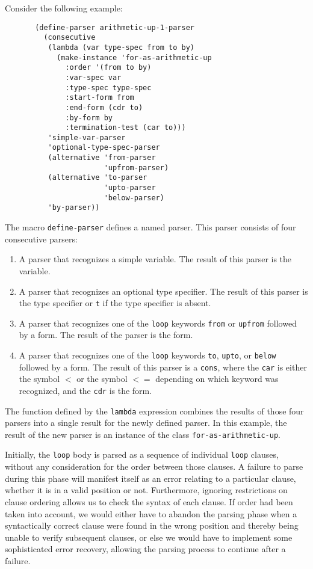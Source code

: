 Consider the following example:

{\small\begin{verbatim}
       (define-parser arithmetic-up-1-parser
         (consecutive
          (lambda (var type-spec from to by)
            (make-instance 'for-as-arithmetic-up
              :order '(from to by)
              :var-spec var
              :type-spec type-spec
              :start-form from
              :end-form (cdr to)
              :by-form by
              :termination-test (car to)))
          'simple-var-parser
          'optional-type-spec-parser
          (alternative 'from-parser
                       'upfrom-parser)
          (alternative 'to-parser
                       'upto-parser
                       'below-parser)
          'by-parser))
\end{verbatim}}

The macro \texttt{define-parser} defines a named parser.  This parser
consists of four consecutive parsers:

\begin{enumerate}
\item A parser that recognizes a simple variable.  The result of this
  parser is the variable.
\item A parser that recognizes an optional type specifier.  The
  result of this parser is the type specifier or \texttt{t} if the
  type specifier is absent.
\item A parser that recognizes one of the \texttt{loop} keywords
  \texttt{from} or \texttt{upfrom} followed by a form.  The result of
  the parser is the form.
\item A parser that recognizes one of the \texttt{loop} keywords
  \texttt{to}, \texttt{upto}, or \texttt{below} followed by a form.
  The result of this parser is a \texttt{cons}, where the \texttt{car}
  is either the symbol \texttt{$<$} or the symbol \texttt{$<=$}
  depending on which keyword was recognized, and the \texttt{cdr} is
  the form.
\end{enumerate}

The function defined by the \texttt{lambda} expression combines the
results of those four parsers into a single result for the
newly defined parser.  In this example, the result of the new parser
is an instance of the class \texttt{for-as-arithmetic-up}.

Initially, the \texttt{loop} body is parsed as a sequence of
individual \texttt{loop} clauses, without any consideration for the
order between those clauses.  A failure to parse during this phase
will manifest itself as an error relating to a particular clause,
whether it is in a valid position or not.  Furthermore, ignoring
restrictions on clause ordering allows us to check the syntax of each
clause.  If order had been taken into account, we would either have to
abandon the parsing phase when a syntactically correct clause were
found in the wrong position and thereby being unable to verify
subsequent clauses, or else we would have to implement some
sophisticated error recovery, allowing the parsing process to continue
after a failure.

